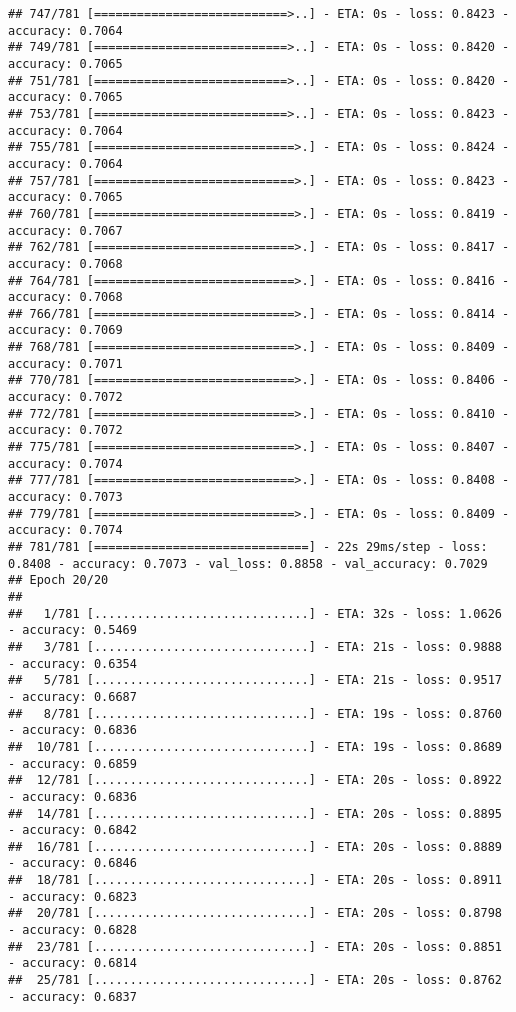 \documentclass[
]{article}
\begin{document}
\begin{verbatim}
## 747/781 [===========================>..] - ETA: 0s - loss: 0.8423 - accuracy: 0.7064
## 749/781 [===========================>..] - ETA: 0s - loss: 0.8420 - accuracy: 0.7065
## 751/781 [===========================>..] - ETA: 0s - loss: 0.8420 - accuracy: 0.7065
## 753/781 [===========================>..] - ETA: 0s - loss: 0.8423 - accuracy: 0.7064
## 755/781 [============================>.] - ETA: 0s - loss: 0.8424 - accuracy: 0.7064
## 757/781 [============================>.] - ETA: 0s - loss: 0.8423 - accuracy: 0.7065
## 760/781 [============================>.] - ETA: 0s - loss: 0.8419 - accuracy: 0.7067
## 762/781 [============================>.] - ETA: 0s - loss: 0.8417 - accuracy: 0.7068
## 764/781 [============================>.] - ETA: 0s - loss: 0.8416 - accuracy: 0.7068
## 766/781 [============================>.] - ETA: 0s - loss: 0.8414 - accuracy: 0.7069
## 768/781 [============================>.] - ETA: 0s - loss: 0.8409 - accuracy: 0.7071
## 770/781 [============================>.] - ETA: 0s - loss: 0.8406 - accuracy: 0.7072
## 772/781 [============================>.] - ETA: 0s - loss: 0.8410 - accuracy: 0.7072
## 775/781 [============================>.] - ETA: 0s - loss: 0.8407 - accuracy: 0.7074
## 777/781 [============================>.] - ETA: 0s - loss: 0.8408 - accuracy: 0.7073
## 779/781 [============================>.] - ETA: 0s - loss: 0.8409 - accuracy: 0.7074
## 781/781 [==============================] - 22s 29ms/step - loss: 0.8408 - accuracy: 0.7073 - val_loss: 0.8858 - val_accuracy: 0.7029
## Epoch 20/20
## 
##   1/781 [..............................] - ETA: 32s - loss: 1.0626 - accuracy: 0.5469
##   3/781 [..............................] - ETA: 21s - loss: 0.9888 - accuracy: 0.6354
##   5/781 [..............................] - ETA: 21s - loss: 0.9517 - accuracy: 0.6687
##   8/781 [..............................] - ETA: 19s - loss: 0.8760 - accuracy: 0.6836
##  10/781 [..............................] - ETA: 19s - loss: 0.8689 - accuracy: 0.6859
##  12/781 [..............................] - ETA: 20s - loss: 0.8922 - accuracy: 0.6836
##  14/781 [..............................] - ETA: 20s - loss: 0.8895 - accuracy: 0.6842
##  16/781 [..............................] - ETA: 20s - loss: 0.8889 - accuracy: 0.6846
##  18/781 [..............................] - ETA: 20s - loss: 0.8911 - accuracy: 0.6823
##  20/781 [..............................] - ETA: 20s - loss: 0.8798 - accuracy: 0.6828
##  23/781 [..............................] - ETA: 20s - loss: 0.8851 - accuracy: 0.6814
##  25/781 [..............................] - ETA: 20s - loss: 0.8762 - accuracy: 0.6837

\end{verbatim}
\end{document}
